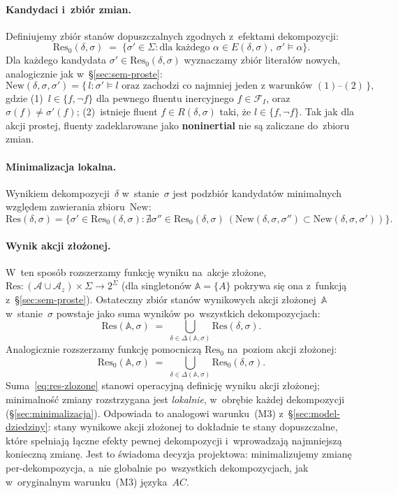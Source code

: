 \documentclass[11pt,a4paper]{article}
\newcommand{\noninertial}{\textbf{noninertial}}
\theoremstyle{definition}
\begin{document}
\paragraph{Kandydaci i~zbiór zmian.}
Definiujemy zbiór stanów dopuszczalnych zgodnych z~efektami
dekompozycji:
\[
  \mathrm{Res}_0(\delta,\sigma)
    \;=\; \{\sigma' \in \Sigma :
      \text{dla każdego } \alpha \in E(\delta,\sigma),\ \sigma' \models \alpha\}.
\]
Dla każdego kandydata $\sigma' \in \mathrm{Res}_0(\delta,\sigma)$
wyznaczamy zbiór literałów nowych, analogicznie jak w~\S\ref{sec:sem-proste}:
\[
  \mathrm{New}(\delta,\sigma,\sigma')
    = \{\, l : \sigma' \models l \text{ oraz zachodzi co najmniej jeden
      z~warunków } (1)\text{--}(2)\,\},
\]
gdzie (1)~$l \in \{f, \neg f\}$ dla pewnego fluentu inercyjnego
$f \in \mathcal{F}_I$, oraz $\sigma(f)\neq\sigma'(f)$;
(2)~istnieje fluent $f \in R(\delta,\sigma)$ taki, że $l \in \{f, \neg f\}$.
Tak jak dla akcji prostej, fluenty zadeklarowane jako \noninertial{}
nie są zaliczane do~zbioru zmian.

\paragraph{Minimalizacja lokalna.}
Wynikiem dekompozycji~$\delta$ w~stanie~$\sigma$ jest podzbiór
kandydatów minimalnych względem zawierania zbioru~$\mathrm{New}$:
\[
  \mathrm{Res}(\delta,\sigma)
  = \{\sigma' \in \mathrm{Res}_0(\delta,\sigma) :
    \nexists \sigma'' \in \mathrm{Res}_0(\delta,\sigma)\
    (\mathrm{New}(\delta,\sigma,\sigma'') \subset
     \mathrm{New}(\delta,\sigma,\sigma'))\}.
\]

\paragraph{Wynik akcji złożonej.}
W~ten sposób rozszerzamy funkcję wyniku na~akcje złożone,
$\mathrm{Res} : (\mathcal{A} \cup \mathcal{A}_z) \times \Sigma \to 2^{\Sigma}$
(dla singletonów $\mathbb{A}=\{A\}$ pokrywa się ona z~funkcją z~\S\ref{sec:sem-proste}).
Ostateczny zbiór stanów wynikowych akcji złożonej~$\mathbb{A}$
w~stanie~$\sigma$ powstaje jako suma wyników po~wszystkich dekompozycjach:
\begin{equation}
  \label{eq:res-zlozone}
  \mathrm{Res}(\mathbb{A},\sigma)
  \;=\; \bigcup_{\delta \in \Delta(\mathbb{A},\sigma)}
        \mathrm{Res}(\delta,\sigma).
\end{equation}
Analogicznie rozszerzamy funkcję pomocniczą $\mathrm{Res}_0$ na~poziom
akcji złożonej:
\[
  \mathrm{Res}_0(\mathbb{A},\sigma)
    \;=\; \bigcup_{\delta \in \Delta(\mathbb{A},\sigma)}
          \mathrm{Res}_0(\delta,\sigma).
\]
Suma~\eqref{eq:res-zlozone} stanowi operacyjną definicję wyniku akcji złożonej;
minimalność zmiany rozstrzygana jest \emph{lokalnie}, w~obrębie każdej dekompozycji
(\S\ref{sec:minimalizacja}). Odpowiada to analogowi warunku~(M3) z~\S\ref{sec:model-dziedziny}:
stany wynikowe akcji złożonej to dokładnie te stany dopuszczalne, które spełniają
łączne efekty pewnej dekompozycji i~wprowadzają najmniejszą konieczną zmianę.
Jest to świadoma decyzja projektowa: minimalizujemy zmianę per-dekompozycja, a~nie
globalnie po~wszystkich dekompozycjach, jak w~oryginalnym warunku~(M3) języka~$AC$.
\end{document}

